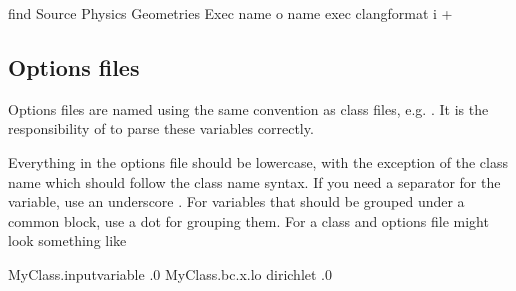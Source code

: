 \documentclass[letterpaper,10pt,english]{sphinxmanual}
\begin{document}
\begin{sphinxVerbatim}[commandchars=\\\{\},formatcom=\scriptsize]
find Source Physics Geometries Exec  \PYGZhy{}name  \PYGZhy{}o \PYGZhy{}name   \PYGZhy{}exec clang\PYGZhy{}format \PYGZhy{}i  +
\end{sphinxVerbatim}


\subsection{Options files}
\label{\detokenize{Contrib/CodeStandard:options-files}}
\sphinxAtStartPar
Options files are named using the same convention as class files, e.g. .
It is the responsibility of  to parse these variables correctly.

\sphinxAtStartPar
Everything in the options file should be lower\sphinxhyphen{}case, with the exception of the class name which should follow the class name syntax.
If you need a separator for the variable, use an underscore \sphinxcode{\sphinxupquote{\_}}.
For variables that should be grouped under a common block, use a dot  for grouping them.
For a class  and options file might look something like

\begin{sphinxVerbatim}[commandchars=\\\{\},formatcom=\scriptsize]
MyClass.input\PYGZus{}variable  .0
MyClass.bc.x.lo         dirichlet .0
\end{sphinxVerbatim}

\sphinxstepscope
\end{document}
